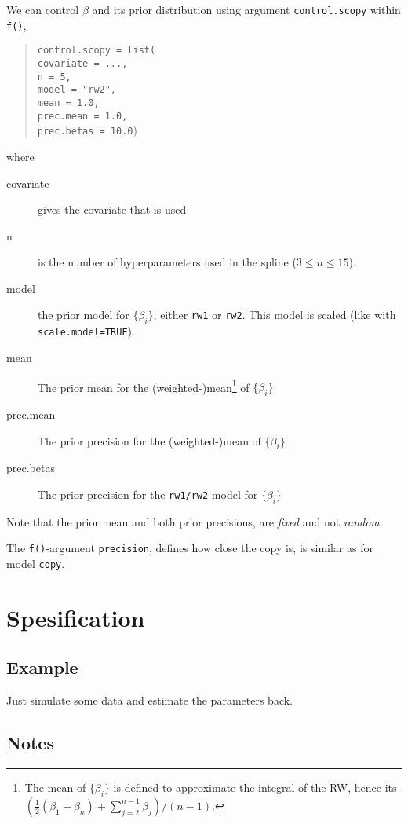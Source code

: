 \documentclass[a4paper,11pt]{article}
\begin{document}
We can control $\beta$ and its prior distribution using argument
\texttt{control.scopy} within \texttt{f()},
\begin{quote}
    \texttt{control.scopy = list(\\
        covariate = ..., \\
        n = 5, \\
        model = "rw2",\\
        mean = 1.0, \\
        prec.mean =  1.0,  \\
        prec.betas =  10.0})
\end{quote}
where
\begin{description}
\item[covariate] gives the covariate that is used
\item[n] is the number of hyperparameters used in the spline
    ($3 \leq n \leq 15$).
\item[model] the prior model for $\{\beta_i\}$, either \texttt{rw1} or
    \texttt{rw2}. This model is scaled (like with
    \texttt{scale.model=TRUE}).
\item[mean] The prior mean for the (weighted-)mean\footnote{The mean
        of $\{\beta_i\}$ is defined to approximate the integral of the
        RW, hence its
        $\left(\frac{1}{2}(\beta_1 + \beta_n) +
          \sum_{j=2}^{n-1}\beta_j\right)/(n-1)$.} of $\{\beta_i\}$
\item[prec.mean] The prior precision for the (weighted-)mean of
    $\{\beta_i\}$
\item[prec.betas] The prior precision for the \texttt{rw1/rw2} model
    for $\{\beta_i\}$
\end{description}
Note that the prior mean and both prior precisions, are \emph{fixed}
and not \emph{random}.

The \texttt{f()}-argument \texttt{precision}, defines how close the
copy is, is similar as for model \texttt{copy}.

\section*{Spesification}



\subsection*{Example}

Just simulate some data and estimate the parameters back. 

{\small}

\subsection*{Notes}
\end{document}
